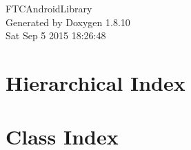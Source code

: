 \documentclass[twoside]{book}
\newcommand{\+}{\discretionary{\mbox{\scriptsize$\hookleftarrow$}}{}{}}
\newcommand{\clearemptydoublepage}{%
  \newpage{\pagestyle{empty}\cleardoublepage}%
}
\begin{document}
\hypersetup{pageanchor=false,
             bookmarks=true,
             bookmarksnumbered=true,
             pdfencoding=unicode
            }
\begin{titlepage}
\vspace*{7cm}
\begin{center}%
{\Large F\+T\+C\+Android\+Library }\\
\vspace*{1cm}
{\large Generated by Doxygen 1.8.10}\\
\vspace*{0.5cm}
{\small Sat Sep 5 2015 18:26:48}\\
\end{center}
\end{titlepage}
\clearemptydoublepage
\tableofcontents
\clearemptydoublepage
{}
\hypersetup{pageanchor=true}

\chapter{Hierarchical Index}

\chapter{Class Index}

\end{document}
